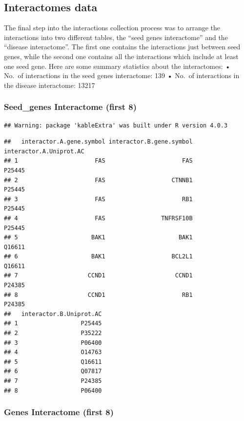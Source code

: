 \documentclass[
]{article}
\begin{document}
\hypertarget{interactomes-data}{%
\subsection{Interactomes data}\label{interactomes-data}}

The final step into the interactions collection process was to arrange
the interactions into two different tables, the ``seed genes
interactome'' and the ``disease interactome''. The first one contains
the interactions just between seed genes, while the second one contains
all the interactions which include at least one seed gene. Here are some
summary statistics about the interactomes: • No.~of interactions in the
seed genes interactome: 139 • No.~of interactions in the disease
interactome: 13217

\hypertarget{seed_genes-interactome-first-8}{%
\subsubsection{Seed\_genes Interactome (first
8)}\label{seed_genes-interactome-first-8}}

\begin{verbatim}
## Warning: package 'kableExtra' was built under R version 4.0.3
\end{verbatim}

\begin{verbatim}
##   interactor.A.gene.symbol interactor.B.gene.symbol interactor.A.Uniprot.AC
## 1                      FAS                      FAS                  P25445
## 2                      FAS                   CTNNB1                  P25445
## 3                      FAS                      RB1                  P25445
## 4                      FAS                TNFRSF10B                  P25445
## 5                     BAK1                     BAK1                  Q16611
## 6                     BAK1                   BCL2L1                  Q16611
## 7                    CCND1                    CCND1                  P24385
## 8                    CCND1                      RB1                  P24385
##   interactor.B.Uniprot.AC
## 1                  P25445
## 2                  P35222
## 3                  P06400
## 4                  O14763
## 5                  Q16611
## 6                  Q07817
## 7                  P24385
## 8                  P06400
\end{verbatim}

\hypertarget{genes-interactome-first-8}{%
\subsubsection{Genes Interactome (first
8)}\label{genes-interactome-first-8}}
\end{document}
